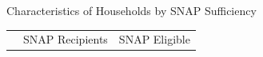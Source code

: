 \documentclass{beamer}
\begin{document}



\begin{frame}
\begin{table}{Characteristics of Households by SNAP Sufficiency}%

\begin{adjustbox}{max width=\textwidth}
  \centering
     \begin{tabular}{lllllll}
    \toprule
    & \multicolumn{3}{l}{SNAP Recipients} & \multicolumn{3}{l}{SNAP Eligible} \\


\end{tabular}
\end{adjustbox}
\end{table}
\end{frame}
\end{document}
